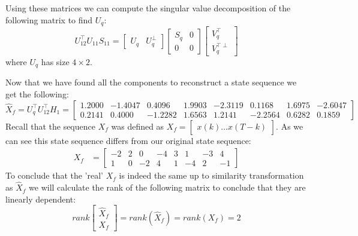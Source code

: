 Using these matrices we can compute the singular value decomposition of the following matrix to find $U_q$:
\begin{equation*}
U^\top_{12} U_{11} S_{11} = \begin{bmatrix} U_q & U_q^\perp \end{bmatrix} \begin{bmatrix} S_q & 0 \\ 0 & 0 \end{bmatrix} \begin{bmatrix}V^\top_q \\ V_q ^{\top \perp} \end{bmatrix}
\end{equation*}
where $U_q$ has size $4 \times 2$.

Now that we have found all the components to reconstruct a state sequence we get the following:
\begin{equation*}
	\hat{X}_f = U_q^\top U_{12}^\top H_1 = 
	\begin{bmatrix}
		1.2000 &  -1.4047 &   0.4096 &   1.9903 &  -2.3119 &   0.1168 &   1.6975 &  -2.6047\\
		0.2141 &   0.4000 &  -1.2282 &   1.6563 &   1.2141 &  -2.2564 &   0.6282 &   0.1859
	\end{bmatrix}
\end{equation*}
Recall that the sequence $X_f$ was defined as $X_f = \begin{bmatrix} x(k) \dots x(T-k) \end{bmatrix}$. As we can see this state sequence differs from our original state sequence:
\begin{align*}
	X_f &= \begin{bmatrix} -2  &   2  &   0  &  -4  &   3  &   1  &  -3  &   4 \\
							1  &   0  &  -2  &   4  &   1  &  -4  &   2  &  -1 \end{bmatrix}
\end{align*}
To conclude that the 'real' $X_f$ is indeed the same up to similarity transformation as $\hat{X}_f$ we will calculate the rank of the following matrix to conclude that they are linearly dependent:
\begin{equation*}
	rank\begin{bmatrix} \hat{X}_f \\ X_f \end{bmatrix} = rank \left( \hat{X}_f \right) = rank \left( X_f \right) = 2
\end{equation*}
